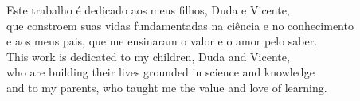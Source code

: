 Este trabalho é dedicado aos meus filhos, Duda e Vicente,\\
que constroem suas vidas fundamentadas na ciência e no conhecimento\\
e aos meus pais, que me ensinaram o valor e o amor pelo saber.\\[2\baselineskip]
This work is dedicated to my children, Duda and Vicente,\\
who are building their lives grounded in science and knowledge\\
and to my parents, who taught me the value and love of learning.
